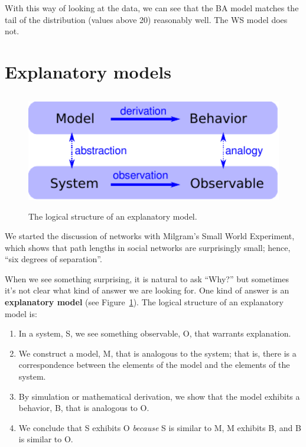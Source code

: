 \documentclass[12pt]{book}
\theoremstyle{exercise}
\begin{document}
With this way of looking at the data, we can see that the BA model
matches the tail of the distribution (values above 20) reasonably well.
The WS model does not.


\section{Explanatory models}
\label{model1}

\begin{figure}
\centerline{\includegraphics[height=2in]{figs/model.pdf}}
\caption{The logical structure of an explanatory model.\label{fig.model}}
\end{figure}

We started the discussion of networks with Milgram's Small World
Experiment, which shows that path lengths in social
networks are surprisingly small; hence, ``six degrees of separation''.


When we see something surprising, it is natural to ask ``Why?''  but
sometimes it's not clear what kind of answer we are looking for.  One
kind of answer is an {\bf explanatory model} (see
Figure~\ref{fig.model}).  The logical structure of an explanatory
model is:

\begin{enumerate}

\item In a system, S, we see something observable, O, that warrants
  explanation.

\item We construct a model, M, that is analogous to the system; that
  is, there is a correspondence between the elements of the model and
  the elements of the system.

\item By simulation or mathematical derivation, we show that the model
  exhibits a behavior, B, that is analogous to O.

\item We conclude that S exhibits O {\em because} S is similar to M, M
  exhibits B, and B is similar to O.

\end{enumerate}
\end{document}
